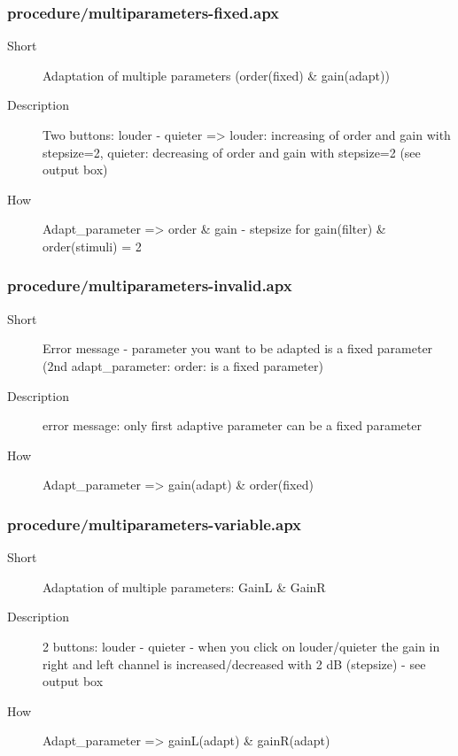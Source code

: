 \subsubsection{procedure/multiparameters-fixed.apx}
\begin{description}
\item[Short] 
 Adaptation of multiple parameters (order(fixed) \& gain(adapt))
\item[Description] 
 Two buttons: louder - quieter =\textgreater{} louder: increasing of order and gain with stepsize=2, quieter: decreasing of order and gain with stepsize=2 (see output box)
\item[How] 
 Adapt\_parameter =\textgreater{} order \& gain - stepsize for gain(filter) \& order(stimuli) = 2
\end{description}

\subsubsection{procedure/multiparameters-invalid.apx}
\begin{description}
\item[Short] 
 Error message - parameter you want to be adapted is a fixed parameter (2nd adapt\_parameter: order: is a fixed parameter)
\item[Description] 
 error message: only first adaptive parameter can be a fixed parameter
\item[How] 
 Adapt\_parameter =\textgreater{} gain(adapt) \& order(fixed)
\end{description}

\subsubsection{procedure/multiparameters-variable.apx}
\begin{description}
\item[Short] 
 Adaptation of multiple parameters: GainL \& GainR
\item[Description] 
 2 buttons: louder - quieter - when you click on louder/quieter the gain in right and left channel is increased/decreased with 2 dB (stepsize) - see output box
\item[How] 
 Adapt\_parameter =\textgreater{} gainL(adapt) \& gainR(adapt)
\end{description}

